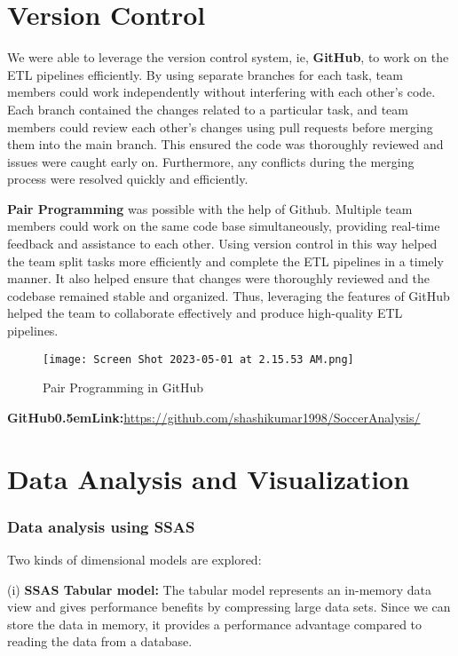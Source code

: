 \documentclass[lettersize]{IEEEtran}
\begin{document}
\section{\textbf{Version Control}}
\vspace{-0.5\baselineskip}
We were able to leverage the version control system, ie, \textbf{GitHub}, to work on the ETL pipelines efficiently. By using separate branches for each task, team members could work independently without interfering with each other's code. Each branch contained the changes related to a particular task, and team members could review each other's changes using pull requests before merging them into the main branch. This ensured the code was thoroughly reviewed and issues were caught early on. Furthermore, any conflicts during the merging process were resolved quickly and efficiently.

\textbf{Pair Programming} was possible with the help of Github. Multiple team members could work on the same code base simultaneously, providing real-time feedback and assistance to each other.
Using version control in this way helped the team split tasks more efficiently and complete the ETL pipelines in a timely manner. It also helped ensure that changes were thoroughly reviewed and the codebase remained stable and organized. 
Thus, leveraging the features of GitHub helped the team to collaborate effectively and produce high-quality ETL pipelines.\

\begin{figure}[H]
    \centering
    \texttt{[image: Screen Shot 2023-05-01 at 2.15.53 AM.png]}
    \caption{Pair Programming in GitHub}
    \label{fig:image_label}
\end{figure}
\textbf{GitHub\kern0.5emLink:}{\url{https://github.com/shashikumar1998/SoccerAnalysis/}}

\section{\textbf{Data Analysis and Visualization}}
\subsubsection{\textbf{Data analysis using SSAS}}
Two kinds of dimensional models are explored:\vspace{0.5em}

(i) \textbf{SSAS Tabular model:} The tabular model represents an in-memory data view and gives performance benefits by compressing large data sets. Since we can store the data in memory, it provides a performance advantage compared to reading the data from a database.
\end{document}
